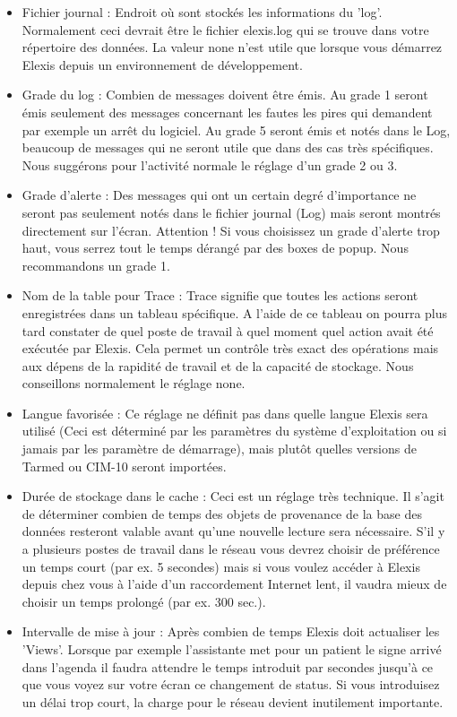 \begin{itemize}
  \item Fichier journal : Endroit où sont stockés les informations du 'log'. Normalement ceci devrait être le fichier  \glqq elexis.log\grqq{} qui se trouve dans votre répertoire des données.  La valeur \glqq none\grqq{} n'est utile que lorsque vous démarrez Elexis depuis un environnement de développement.
  \item Grade du log : Combien de messages doivent être émis. Au grade 1 seront émis seulement des messages concernant les fautes les pires qui demandent par exemple un arrêt du logiciel. Au grade 5 seront émis et notés dans le Log, beaucoup de messages qui ne seront utile que dans des cas très spécifiques. Nous suggérons pour l'activité normale le réglage d'un grade 2 ou 3.
  \item Grade d'alerte : Des messages qui ont un certain degré d'importance ne seront pas seulement notés dans le fichier journal (Log) mais seront montrés directement sur l'écran. Attention ! Si vous choisissez un grade d'alerte trop haut, vous serrez tout le temps dérangé  par des boxes de popup. Nous recommandons un grade 1.
  \item Nom de la table pour Trace : Trace signifie que toutes les actions seront enregistrées dans un tableau spécifique. A l'aide de ce tableau on pourra plus tard constater de quel poste de travail à quel moment quel action avait été exécutée par Elexis. Cela permet un contrôle très exact des opérations mais aux dépens de la rapidité de travail et de la capacité de stockage. Nous conseillons normalement le réglage \glqq none\grqq{}.
  \item Langue favorisée : Ce réglage ne définit pas dans quelle langue Elexis sera utilisé (Ceci est déterminé par les paramètres du système d'exploitation ou si jamais par les paramètre de démarrage), mais plutôt quelles versions de Tarmed ou CIM-10 seront importées.
  \item Durée de stockage dans le cache : Ceci est un réglage très technique. Il s'agit de déterminer combien de temps des objets de provenance de la base des données resteront valable avant qu'une nouvelle lecture sera nécessaire. S'il y a plusieurs postes de travail dans le réseau vous devrez choisir de préférence un temps court (par ex. 5 secondes) mais si vous voulez accéder à Elexis depuis chez vous à l'aide d'un raccordement Internet lent, il vaudra mieux de choisir un temps prolongé (par ex. 300 sec.).
  \item Intervalle de mise à jour : Après combien de temps Elexis doit actualiser les 'Views'. Lorsque par exemple l'assistante met pour un patient le signe \glqq arrivé\grqq{} dans l'agenda il faudra attendre le temps introduit par secondes jusqu'à ce que vous voyez sur votre écran ce changement de status. Si vous introduisez un délai trop court, la charge pour le réseau devient inutilement importante.
\end{itemize}
